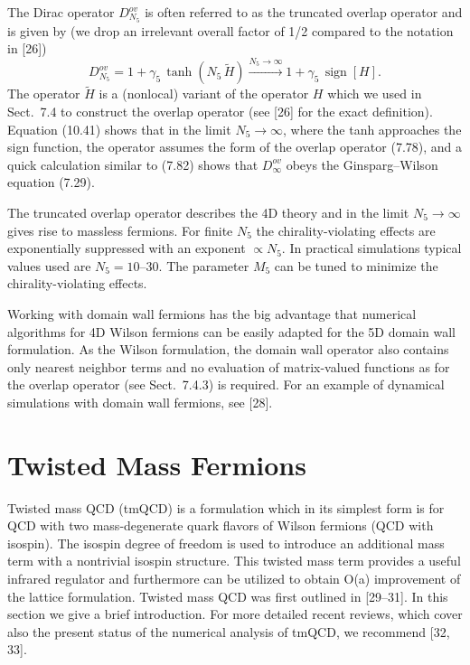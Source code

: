 The Dirac operator $D_{N_5}^{ov}$ is often referred to as the truncated
overlap operator and is given by (we drop an irrelevant overall factor of 1/2
compared to the notation in [26])
\begin{equation}
  D_{N_5}^{ov} = 1 + \gamma_5\, \tanh\left(N_5\, \tilde H\right)
  \xrightarrow{N_5\to\infty}
  1 + \gamma_5\, \operatorname{sign}[H] .
\end{equation}
The operator $\tilde H$ is a (nonlocal) variant of the operator $H$ which we
used in Sect.~7.4 to construct the overlap operator (see [26] for the exact
definition). Equation (10.41) shows that in the limit $N_5 \to \infty$, where
the tanh approaches the sign function, the operator assumes the form of the
overlap operator (7.78), and a quick calculation similar to (7.82) shows that
$D_{\infty}^{ov}$ obeys the Ginsparg--Wilson equation (7.29).

The truncated overlap operator describes the 4D theory and in the limit
$N_5 \to \infty$ gives rise to massless fermions. For finite $N_5$ the
chirality-violating effects are exponentially suppressed with an exponent
$\propto N_5$. In practical simulations typical values used are $N_5 = 10$--$30$.
The parameter $M_5$ can be tuned to minimize the chirality-violating effects.

Working with domain wall fermions has the big advantage that numerical
algorithms for 4D Wilson fermions can be easily adapted for the 5D domain wall
formulation. As the Wilson formulation, the domain wall operator also contains
only nearest neighbor terms and no evaluation of matrix-valued functions as
for the overlap operator (see Sect.~7.4.3) is required. For an example of
dynamical simulations with domain wall fermions, see [28].

\section{Twisted Mass Fermions}

Twisted mass QCD (tmQCD) is a formulation which in its simplest form is for
QCD with two mass-degenerate quark flavors of Wilson fermions (QCD with
isospin). The isospin degree of freedom is used to introduce an additional
mass term with a nontrivial isospin structure. This twisted mass term provides
a useful infrared regulator and furthermore can be utilized to obtain O(a)
improvement of the lattice formulation. Twisted mass QCD was first outlined in
[29--31]. In this section we give a brief introduction. For more detailed
recent reviews, which cover also the present status of the numerical analysis
of tmQCD, we recommend [32, 33].

